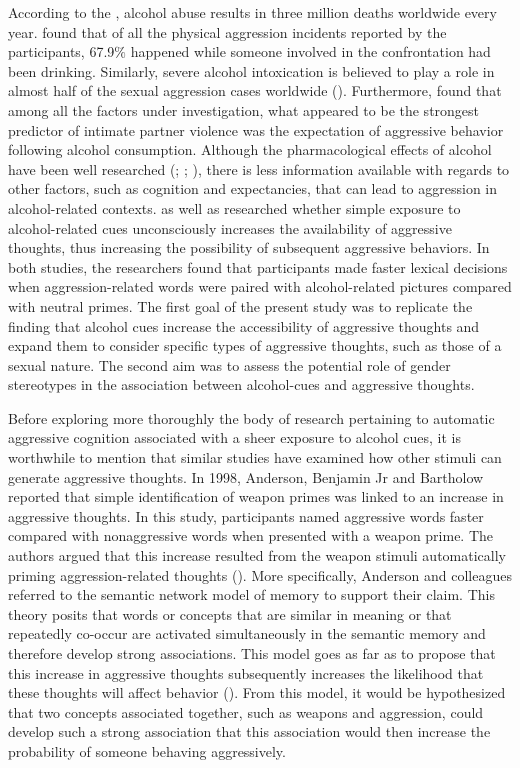 \documentclass[serif, authorddate, twocolumn, empirical]{jote-article}
\begin{document}
According to the \textcite{Organization}, alcohol abuse results in three million deaths worldwide every year. \textcite{WellsGrahamWest2000} found that of all the physical aggression incidents reported by the participants, 67.9$\%$  happened while someone involved in the confrontation had been drinking. Similarly, severe alcohol intoxication is believed to play a role in almost half of the sexual aggression cases worldwide (\cite{Testa2002}). Furthermore, \textcite{FieldCaetanoNelson2004} found that among all the factors under investigation, what appeared to be the strongest predictor of intimate partner violence was the expectation of aggressive behavior following alcohol consumption. Although the pharmacological effects of alcohol have been well researched (\cite{ChermackTaylor1995}; \cite{Giancola2000}; \cite{HeinzBeckMeyerLindenbergSterzerHeinz2011}), there is less information available with regards to other factors, such as cognition and expectancies, that can lead to aggression in alcohol-related contexts. \textcite{BartholowHeinz2006} as well as \textcite{SubraMullerBegueLBushmanDelmas2010} researched whether simple exposure to alcohol-related cues unconsciously increases the availability of aggressive thoughts, thus increasing the possibility of subsequent aggressive behaviors. In both studies, the researchers found that participants made faster lexical decisions when aggression-related words were paired with alcohol-related pictures compared with neutral primes. The first goal of the present study was to replicate the finding that alcohol cues increase the accessibility of aggressive thoughts and expand them to consider specific types of aggressive thoughts, such as those of a sexual nature. The second aim was to assess the potential role of gender stereotypes in the association between alcohol-cues and aggressive thoughts.

Before exploring more thoroughly the body of research pertaining to automatic aggressive cognition associated with a sheer exposure to alcohol cues, it is worthwhile to mention that similar studies have examined how other stimuli can generate aggressive thoughts. In 1998, Anderson, Benjamin Jr and Bartholow reported that simple identification of weapon primes was linked to an increase in aggressive thoughts. In this study, participants named aggressive words faster compared with nonaggressive words when presented with a weapon prime. The authors argued that this increase resulted from the weapon stimuli automatically priming aggression-related thoughts (\cite{AndersonJrJBartholow1998}). More specifically, Anderson and colleagues referred to the semantic network model of memory to support their claim. This theory posits that words or concepts that are similar in meaning or that repeatedly co-occur are activated simultaneously in the semantic memory and therefore develop strong associations. This model goes as far as to propose that this increase in aggressive thoughts subsequently increases the likelihood that these thoughts will affect behavior (\cite{BartholowHeinz2006}). From this model, it would be hypothesized that two concepts associated together, such as weapons and aggression, could develop such a strong association that this association would then increase the probability of someone behaving aggressively. 
\end{document}
